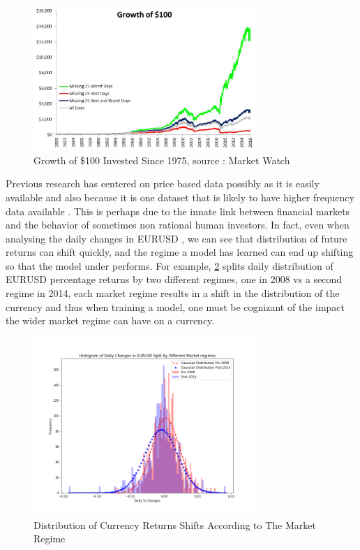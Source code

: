 \documentclass[12pt, a4paper]{article}
\begin{document}
\begin{figure}[h]
    \centering
    \includegraphics[width=0.75\textwidth]{beststockdays}
    \caption{Growth of \$100 Invested Since 1975, source : Market Watch}
    \label{fig:beststockdays}
\end{figure}


\par Previous research has centered on price based data possibly as it is easily available and also because it is one dataset that is likely to have higher frequency data available \cite{Huang2005} \cite{Shen2012} \cite{Wang2014}. This is perhaps due to the innate link between financial markets and the behavior of sometimes non rational human investors.
In fact, even when analysing the daily changes in EURUSD , we can see that distribution of future returns can shift quickly, and the regime a model has learned can end up shifting so that the model under performs. For example, \ref{fig:Regimehist} splits daily distribution of EURUSD percentage returns by two different regimes, one in 2008 vs a second regime in 2014, each market regime results in a shift in the distribution of the currency and thus when training a model, one must be cognizant of the impact the wider market regime can have on a currency.
\begin{figure}[h]
    \centering
    \includegraphics[width=0.75\textwidth]{Regimehist}
    \caption{Distribution of Currency Returns Shifts According to The Market Regime}
    \label{fig:Regimehist}
\end{figure}
\end{document}
